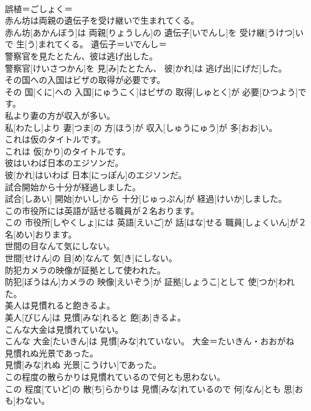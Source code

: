 \documentclass[8pt]{extreport}
\begin{document}
\begin{CJK}{UTF8}{min}
\\	誤植＝ごしょく＝ 
\\	赤ん坊は両親の遺伝子を受け継いで生まれてくる。	
\\	赤ん坊[あかんぼう]は 両親[りょうしん]の 遺伝子[いでんし]を 受け継[うけつ]いで 生[う]まれてくる。	遺伝子＝いでんし＝ 
\\	警察官を見たとたん、彼は逃げ出した。	
\\	警察官[けいさつかん]を 見[み]たとたん、 彼[かれ]は 逃げ出[にげだ]した。	
\\	その国への入国はビザの取得が必要です。	
\\	その 国[くに]への 入国[にゅうこく]はビザの 取得[しゅとく]が 必要[ひつよう]です。	
\\	私より妻の方が収入が多い。	
\\	私[わたし]より 妻[つま]の 方[ほう]が 収入[しゅうにゅう]が 多[おお]い。	
\\	これは仮のタイトルです。	
\\	これは 仮[かり]のタイトルです。	
\\	彼はいわば日本のエジソンだ。	
\\	彼[かれ]はいわば 日本[にっぽん]のエジソンだ。	
\\	試合開始から十分が経過しました。	
\\	試合[しあい] 開始[かいし]から 十分[じゅっぷん]が 経過[けいか]しました。	
\\	この市役所には英語が話せる職員が２名おります。	
\\	この 市役所[しやくしょ]には 英語[えいご]が 話[はな]せる 職員[しょくいん]が２ 名[めい]おります。	
\\	世間の目なんて気にしない。	
\\	世間[せけん]の 目[め]なんて 気[き]にしない。	
\\	防犯カメラの映像が証拠として使われた。	
\\	防犯[ぼうはん]カメラの 映像[えいぞう]が 証拠[しょうこ]として 使[つか]われた。	
\\	美人は見慣れると飽きるよ。	
\\	美人[びじん]は 見慣[みな]れると 飽[あ]きるよ。	
\\	こんな大金は見慣れていない。	
\\	こんな 大金[たいきん]は 見慣[みな]れていない。	大金＝たいきん・おおがね
\\	見慣れぬ光景であった。	
\\	見慣[みな]れぬ 光景[こうけい]であった。	
\\	この程度の散らかりは見慣れているので何とも思わない。	
\\	この 程度[ていど]の 散[ち]らかりは 見慣[みな]れているので 何[なん]とも 思[おも]わない。	

\end{CJK}
\end{document}
